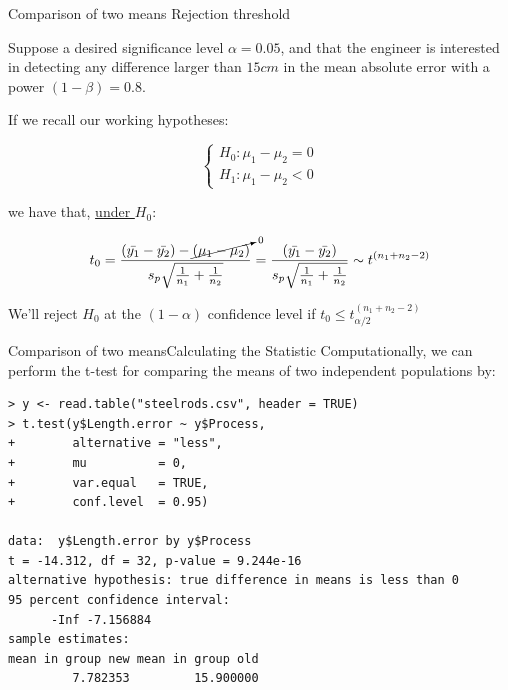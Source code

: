 \begin{frame}
{Comparison of two means}
{Rejection threshold}

Suppose a desired significance level $\alpha = 0.05$, and that the engineer is interested in detecting any difference larger than $15cm$ in the mean absolute error with a power $(1-\beta) = 0.8$.\medskip

If we recall our working hypotheses:

\begin{equation*}
\begin{cases}
H_0: \mu_1 - \mu_2 = 0\\
H_1: \mu_1 - \mu_2 < 0
\end{cases}
\end{equation*}

\noindent we have that, \underline{under $H_0$}:

\begin{equation*}
t_0 = \frac{\left(\bar{y_1} - \bar{y_2}\right) - \cancelto{0}{\left(\mu_1 - \mu_2\right)}}{s_p\sqrt{\frac{1}{n_1} + \frac{1}{n_2}}} = \frac{\left(\bar{y_1} - \bar{y_2}\right)}{s_p\sqrt{\frac{1}{n_1} + \frac{1}{n_2}}}\sim t^{\left(n_1+n_2-2\right)}
\end{equation*}

We'll reject $H_0$ at the $(1-\alpha)$ confidence level if $t_0\leq t^{(n_1+n_2-2)}_{\alpha/2}$
\end{frame}


\begin{frame}[fragile]{Comparison of two means}{Calculating the Statistic}
Computationally, we can perform the t-test for comparing the means of two independent populations by:
\bigskip
{\smaller
\begin{verbatim}
> y <- read.table("steelrods.csv", header = TRUE)
> t.test(y$Length.error ~ y$Process,
+        alternative = "less",
+        mu          = 0,
+        var.equal   = TRUE,
+        conf.level  = 0.95)

data:  y$Length.error by y$Process
t = -14.312, df = 32, p-value = 9.244e-16
alternative hypothesis: true difference in means is less than 0
95 percent confidence interval:
      -Inf -7.156884
sample estimates:
mean in group new mean in group old
         7.782353         15.900000
\end{verbatim}}
\end{frame}


